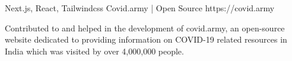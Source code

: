 \begin{cventries}


\cventry
{Next.js, React, Tailwindcss} %
{Covid.army | Open Source} %
{https://covid.army} %
{} %
{
	\begin{cvitems} %
		\item {Contributed to and helped in the development of covid.army, an open-source website dedicated to providing information on COVID-19 related resources in India which was visited by over 4,000,000 people.}
	\end{cvitems}
}


\end{cventries}
